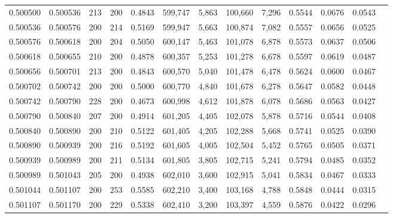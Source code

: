 \begin{tabular}{rrrrrrrrrrrrr}
0.500500 & 0.500536 &    213 & 200 &                                     0.4843 & 599,747 &   5,863 & 100,660 &   7,296 & 0.5544 & 0.0676 & 0.0543 \\
0.500536 & 0.500576 &    200 & 214 &                                     0.5169 & 599,947 &   5,663 & 100,874 &   7,082 & 0.5557 & 0.0656 & 0.0525 \\
0.500576 & 0.500618 &    200 & 204 &                                     0.5050 & 600,147 &   5,463 & 101,078 &   6,878 & 0.5573 & 0.0637 & 0.0506 \\
0.500618 & 0.500655 &    210 & 200 &                                     0.4878 & 600,357 &   5,253 & 101,278 &   6,678 & 0.5597 & 0.0619 & 0.0487 \\
0.500656 & 0.500701 &    213 & 200 &                                     0.4843 & 600,570 &   5,040 & 101,478 &   6,478 & 0.5624 & 0.0600 & 0.0467 \\
0.500702 & 0.500742 &    200 & 200 &                                     0.5000 & 600,770 &   4,840 & 101,678 &   6,278 & 0.5647 & 0.0582 & 0.0448 \\
0.500742 & 0.500790 &    228 & 200 &                                     0.4673 & 600,998 &   4,612 & 101,878 &   6,078 & 0.5686 & 0.0563 & 0.0427 \\
0.500790 & 0.500840 &    207 & 200 &                                     0.4914 & 601,205 &   4,405 & 102,078 &   5,878 & 0.5716 & 0.0544 & 0.0408 \\
0.500840 & 0.500890 &    200 & 210 &                                     0.5122 & 601,405 &   4,205 & 102,288 &   5,668 & 0.5741 & 0.0525 & 0.0390 \\
0.500890 & 0.500939 &    200 & 216 &                                     0.5192 & 601,605 &   4,005 & 102,504 &   5,452 & 0.5765 & 0.0505 & 0.0371 \\
0.500939 & 0.500989 &    200 & 211 &                                     0.5134 & 601,805 &   3,805 & 102,715 &   5,241 & 0.5794 & 0.0485 & 0.0352 \\
0.500989 & 0.501043 &    205 & 200 &                                     0.4938 & 602,010 &   3,600 & 102,915 &   5,041 & 0.5834 & 0.0467 & 0.0333 \\
0.501044 & 0.501107 &    200 & 253 &                                     0.5585 & 602,210 &   3,400 & 103,168 &   4,788 & 0.5848 & 0.0444 & 0.0315 \\
0.501107 & 0.501170 &    200 & 229 &                                     0.5338 & 602,410 &   3,200 & 103,397 &   4,559 & 0.5876 & 0.0422 & 0.0296 \\

\end{tabular}
